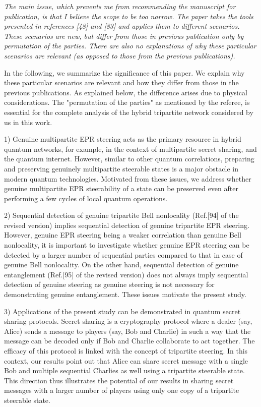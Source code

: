 \documentclass[12pt,showpacs,bibnotes,prl,onecolumn]{revtex4}
\newcommand{\red}{\color[rgb]{0.8,0,0}}
\newcommand{\blue}{\color[rgb]{0,0,0.6}}
\begin{document}
{\red{\bf{Referee's Comment:}}} \textit{The main issue, which prevents me from recommending the manuscript for publication, is that I believe the scope to be too narrow. The paper takes the tools presented in references [48] and [83] and applies them to different scenarios. These scenarios are new, but differ from those
in previous publication only by permutation of the parties. There are also no explanations of why these particular scenarios are relevant (as opposed to those from the previous publications).}

{\blue{\bf{Author's Response:}}}  In the following, we summarize the significance of this paper. We explain why these particular scenarios are relevant and how they differ from those in the previous publications. As explained below, the difference arises due to
physical considerations. The "permutation of the parties" as mentioned by the referee,
is essential for the complete analysis of the hybrid tripartite network considered
by us in this work. 

1) Genuine multipartite EPR steering acts as the primary resource in hybrid quantum networks, for example, in the context of multipartite secret sharing, and the quantum internet. However, similar to other quantum correlations, preparing and preserving genuinely multipartite steerable states is a major obstacle in modern quantum technologies. Motivated from these issues, we address whether genuine multipartite EPR steerability of a state can be preserved even after performing a few cycles of local quantum operations.

2)  Sequential detection of genuine tripartite Bell nonlocality (Ref.[94] of the revised version) implies sequential detection of genuine tripartite EPR steering. However, genuine EPR steering being a weaker correlation than genuine Bell nonlocality, it is important to investigate whether genuine EPR steering can be detected by a larger number of sequential parties compared to that in case of genuine Bell nonlocality. On the other hand, sequential detection of genuine entanglement (Ref.[95] of the revised version) does not always imply sequential detection of genuine steering as genuine steering is not necessary for demonstrating genuine entanglement. These issues motivate the present study.

3) Applications of the present study can  be demonstrated in quantum secret sharing protocols. Secret sharing is a cryptography protocol where a dealer (say, Alice)  sends a message to players (say, Bob and Charlie) in  such a way that the message can be decoded only if Bob and Charlie collaborate to act together. The efficacy of this protocol is linked with the concept of tripartite steering. In this context, our results point out that Alice can share secret message with a single Bob and multiple sequential Charlies as well using a tripartite steerable state. This direction thus illustrates the potential of our results in sharing secret messages with a larger number of players using only one copy of a tripartite steerable state. 
\end{document}
